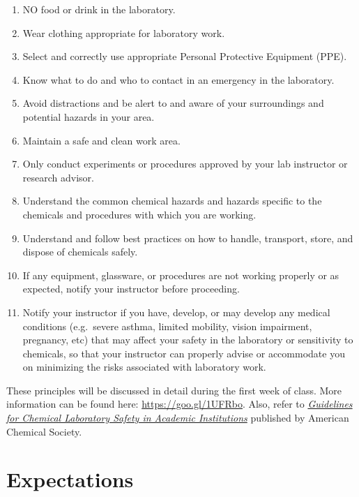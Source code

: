 \begin{enumerate}
\def\labelenumi{\arabic{enumi}.}
\tightlist
\item
  NO food or drink in the laboratory.
\item
  Wear clothing appropriate for laboratory work.
\item
  Select and correctly use appropriate Personal Protective Equipment
  (PPE).
\item
  Know what to do and who to contact in an emergency in the laboratory.
\item
  Avoid distractions and be alert to and aware of your surroundings and
  potential hazards in your area.
\item
  Maintain a safe and clean work area.
\item
  Only conduct experiments or procedures approved by your lab instructor
  or research advisor.
\item
  Understand the common chemical hazards and hazards specific to the
  chemicals and procedures with which you are working.
\item
  Understand and follow best practices on how to handle, transport,
  store, and dispose of chemicals safely.
\item
  If any equipment, glassware, or procedures are not working properly or
  as expected, notify your instructor before proceeding.
\item
  Notify your instructor if you have, develop, or may develop any
  medical conditions (e.g.~severe asthma, limited mobility, vision
  impairment, pregnancy, etc) that may affect your safety in the
  laboratory or sensitivity to chemicals, so that your instructor can
  properly advise or accommodate you on minimizing the risks associated
  with laboratory work.
\end{enumerate}

These principles will be discussed in detail during the first week of
class. More information can be found here: \url{https://goo.gl/1UFRbo}.
Also, refer to
\href{https://www.acs.org/content/dam/acsorg/about/governance/committees/chemicalsafety/publications/acs-safety-guidelines-academic.pdf}{\emph{Guidelines
for Chemical Laboratory Safety in Academic Institutions}} published by
American Chemical Society.

\hypertarget{expectations}{%
\section{Expectations}\label{expectations}}


